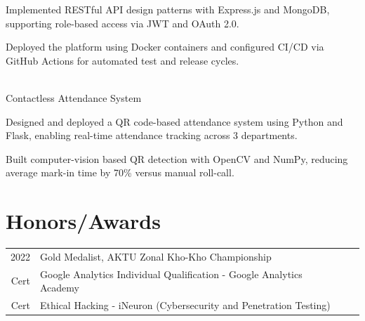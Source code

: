\documentclass[letterpaper]{deedy-resume}
\begin{document}
\begin{minipage}[t]{0.66\textwidth}
\begin{tightemize}
    \item Implemented RESTful API design patterns with Express.js and MongoDB, supporting role-based access via JWT and OAuth 2.0.
    
    \item Deployed the platform using Docker containers and configured CI/CD via GitHub Actions for automated test and release cycles.
    
\end{tightemize}
\sectionsep 

 \\
Contactless Attendance System
\begin{tightemize}
    
    \item Designed and deployed a QR code-based attendance system using Python and Flask, enabling real-time attendance tracking across 3 departments.
    
    \item Built computer-vision based QR detection with OpenCV and NumPy, reducing average mark-in time by 70\% versus manual roll-call.
    
\end{tightemize}
\sectionsep 



\section{Honors/Awards} 
\begin{tabular}{rll}

2022 & Gold Medalist, AKTU Zonal Kho-Kho Championship \\


Cert & Google Analytics Individual Qualification - Google Analytics Academy \\

Cert & Ethical Hacking - iNeuron (Cybersecurity and Penetration Testing) \\

\end{tabular}
\sectionsep 

\end{minipage} 
\end{document}
